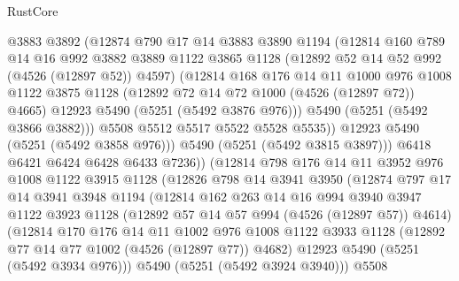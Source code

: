 \begin{lexlean}{RustCore}
\begin{coremodule}
                @3883
                @3892
                (@12874
                  @790
                  @17
                  @14
                  @3883
                  @3890
                  @1194
                  (@12814
                    @160
                    @789
                    @14
                    @16
                    @992
                    @3882
                    @3889
                    @1122
                    @3865
                    @1128
                    (@12892 @52 @14 @52 @992 (@4526 (@12897 @52)) @4597)
                    (@12814
                      @168
                      @176
                      @14
                      @11
                      @1000
                      @976
                      @1008
                      @1122
                      @3875
                      @1128
                      (@12892 @72 @14 @72 @1000 (@4526 (@12897 @72)) @4665)
                      @12923
                      @5490
                      (@5251 (@5492 @3876 @976)))
                    @5490
                    (@5251 (@5492 @3866 @3882)))
                  @5508
                  @5512
                  @5517
                  @5522
                  @5528
                  @5535))
              @12923
              @5490
              (@5251 (@5492 @3858 @976)))
            @5490
            (@5251 (@5492 @3815 @3897)))
          @6418
          @6421
          @6424
          @6428
          @6433
          @7236))
      (@12814
        @798
        @176
        @14
        @11
        @3952
        @976
        @1008
        @1122
        @3915
        @1128
        (@12826
          @798
          @14
          @3941
          @3950
          (@12874
            @797
            @17
            @14
            @3941
            @3948
            @1194
            (@12814
              @162
              @263
              @14
              @16
              @994
              @3940
              @3947
              @1122
              @3923
              @1128
              (@12892 @57 @14 @57 @994 (@4526 (@12897 @57)) @4614)
              (@12814
                @170
                @176
                @14
                @11
                @1002
                @976
                @1008
                @1122
                @3933
                @1128
                (@12892 @77 @14 @77 @1002 (@4526 (@12897 @77)) @4682)
                @12923
                @5490
                (@5251 (@5492 @3934 @976)))
              @5490
              (@5251 (@5492 @3924 @3940)))
            @5508

\end{coremodule}
\end{lexlean}
